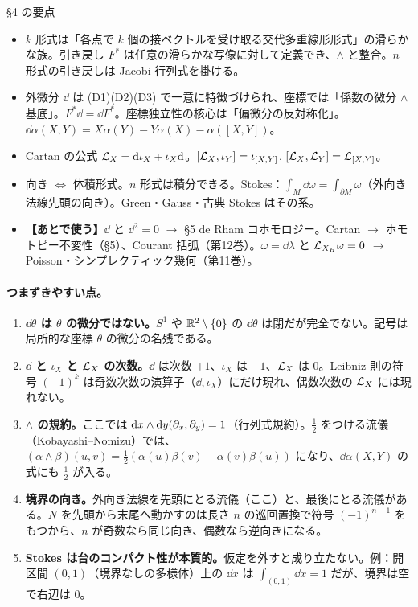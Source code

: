 \begin{keybox}{§4 の要点}
\begin{itemize}
\item $k$ 形式は「各点で $k$ 個の接ベクトルを受け取る交代多重線形形式」の滑らかな族。引き戻し $F^*$ は任意の滑らかな写像に対して定義でき、$\wedge$ と整合。$n$ 形式の引き戻しは Jacobi 行列式を掛ける。
\item 外微分 $\dd$ は (D1)(D2)(D3) で一意に特徴づけられ、座標では「係数の微分 $\wedge$ 基底」。$F^*\dd=\dd F^*$。座標独立性の核心は「偏微分の反対称化」。$\dd\alpha(X,Y)=X\alpha(Y)-Y\alpha(X)-\alpha([X,Y])$。
\item Cartan の公式 $\mathcal L_X=\mathrm{d}\iota_X+\iota_X\mathrm{d}$。$[\mathcal L_X,\iota_Y]=\iota_{[X,Y]}$, $[\mathcal L_X,\mathcal L_Y]=\mathcal L_{[X,Y]}$。
\item 向き $\Leftrightarrow$ 体積形式。$n$ 形式は積分できる。Stokes：$\int_M\dd\omega=\int_{\partial M}\omega$（外向き法線先頭の向き）。Green・Gauss・古典 Stokes はその系。
\item \textbf{【あとで使う】}$\dd$ と $\dd^2=0$ $\to$ §5 de Rham コホモロジー。Cartan $\to$ ホモトピー不変性（§5）、Courant 括弧（第12巻）。$\omega=\dd\lambda$ と $\mathcal L_{X_H}\omega=0$ $\to$ Poisson・シンプレクティック幾何（第11巻）。
\end{itemize}
\end{keybox}

\paragraph{つまずきやすい点。}
\begin{enumerate}
\item \textbf{$\dd\theta$ は $\theta$ の微分ではない。}$S^1$ や $\mathbb R^2\setminus\{0\}$ の $\dd\theta$ は閉だが完全でない。記号は局所的な座標 $\theta$ の微分の名残である。
\item \textbf{$\dd$ と $\iota_X$ と $\mathcal L_X$ の次数。}$\dd$ は次数 $+1$、$\iota_X$ は $-1$、$\mathcal L_X$ は $0$。Leibniz 則の符号 $(-1)^k$ は奇数次数の演算子（$\dd,\iota_X$）にだけ現れ、偶数次数の $\mathcal L_X$ には現れない。
\item \textbf{$\wedge$ の規約。}ここでは $\mathrm{d} x\wedge\mathrm{d} y(\partial_x,\partial_y)=1$（行列式規約）。$\frac12$ をつける流儀（Kobayashi--Nomizu）では、$(\alpha\wedge\beta)(u,v)=\frac12(\alpha(u)\beta(v)-\alpha(v)\beta(u))$ になり、$\dd\alpha(X,Y)$ の式にも $\frac12$ が入る。
\item \textbf{境界の向き。}外向き法線を先頭にとる流儀（ここ）と、最後にとる流儀がある。$N$ を先頭から末尾へ動かすのは長さ $n$ の巡回置換で符号 $(-1)^{n-1}$ をもつから、$n$ が奇数なら同じ向き、偶数なら逆向きになる。
\item \textbf{Stokes は台のコンパクト性が本質的。}仮定を外すと成り立たない。例：開区間 $(0,1)$（境界なしの多様体）上の $\dd x$ は $\int_{(0,1)}\dd x=1$ だが、境界は空で右辺は $0$。
\end{enumerate}

